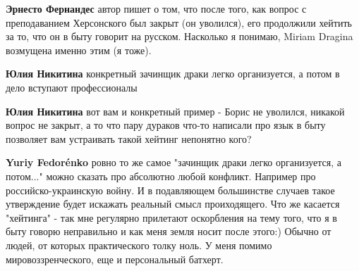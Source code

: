 \begin{itemize}
\begin{itemize}
 
\textbf{Эрнесто Фернандес} автор пишет о том, что после того, как вопрос с преподаванием Херсонского был закрыт (он уволился), его продолжили хейтить за то, что он в быту говорит на русском. Насколько я понимаю, Miriam Dragina возмущена именно этим (я тоже).

 
\textbf{Юлия Никитина} конкретный зачинщик драки легко организуется, а потом в дело вступают профессионалы

 
\textbf{Юлия Никитина} вот вам и конкретный пример - Борис не уволился, никакой вопрос не закрыт, а то что пару дураков что-то написали про язык в быту позволяет вам устраивать такой хейтинг непонятно кого?

 
\textbf{Yuriy Fedorénko} ровно то же самое "зачинщик драки легко организуется, а потом..." можно сказать про абсолютно любой конфликт. Например про российско-украинскую войну. И в подавляющем большинстве случаев такое утверждение будет искажать реальный смысл проиходящего. Что же касается "хейтинга" - так мне регулярно прилетают оскорбления на тему того, что я в быту говорю неправильно и как меня земля носит после этого:) Обычно от людей, от которых практического толку ноль.
У меня помимо мировоззренческого, еще и персональный батхерт.

 

\end{itemize}
\end{itemize}
